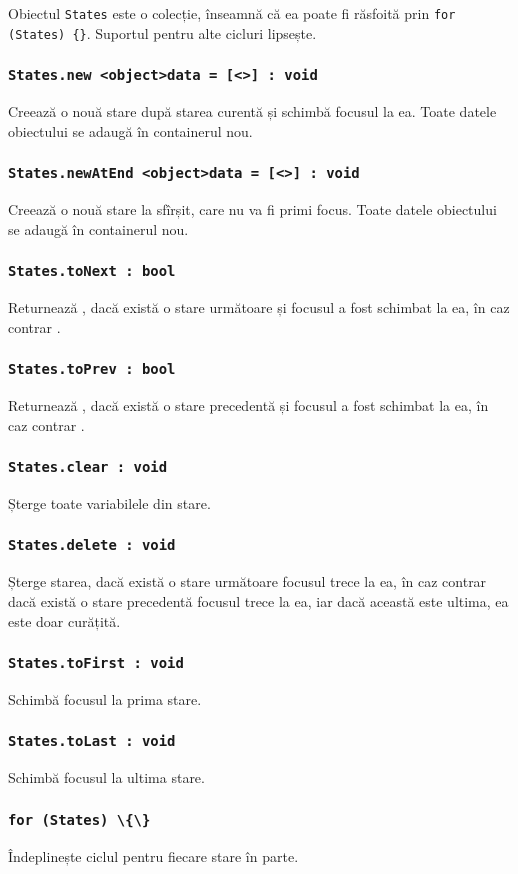 Obiectul \lstinline|States| este o colecție, înseamnă că ea poate fi răsfoită prin \lstinline|for (States) {}|. Suportul pentru alte cicluri lipsește.

\subsubsection{\lstinline|States.new <object>data = [<>] : void|}

Creează o nouă stare după starea curentă și schimbă focusul la ea. Toate datele obiectului  se adaugă în containerul nou.

\subsubsection{\lstinline|States.newAtEnd <object>data = [<>] : void|}

Creează o nouă stare la sfîrșit, care nu va fi primi focus.  Toate datele obiectului  se adaugă în containerul nou.

\subsubsection{\lstinline|States.toNext : bool|}

Returnează \true, dacă există o stare următoare și focusul a fost schimbat la ea, în caz contrar \false.

\subsubsection{\lstinline|States.toPrev : bool|}

Returnează \true, dacă există o stare precedentă și focusul a fost schimbat la ea, în caz contrar \false.

\subsubsection{\lstinline|States.clear : void|}

Șterge toate variabilele din stare.

\subsubsection{\lstinline|States.delete : void|}

Șterge starea, dacă există o stare următoare focusul trece la ea, în caz contrar dacă există o stare precedentă focusul trece la ea, iar dacă această este ultima, ea este doar curățită.

\subsubsection{\lstinline|States.toFirst : void|}

Schimbă focusul la prima stare.

\subsubsection{\lstinline|States.toLast : void|}

Schimbă focusul la ultima stare.

\subsubsection{\lstinline|for (States) \{\}|}

Îndeplinește ciclul pentru fiecare stare în parte.

